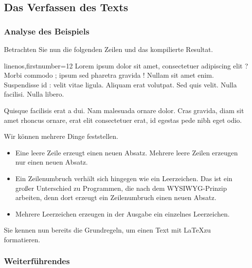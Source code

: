 \subsection{Das Verfassen des Texts}

\subsubsection{Analyse des Beispiels}
Betrachten Sie nun die folgenden Zeilen und das kompilierte Resultat.


\begin{latexcode*}{linenos,firstnumber=12}
Lorem ipsum dolor sit amet, consectetuer adipiscing elit ?
Morbi commodo ; ipsum sed pharetra gravida !
Nullam sit amet enim. Suspendisse id : velit vitae ligula.
Aliquam erat volutpat.
Sed quis velit. Nulla facilisi. Nulla libero. 

Quisque facilisis erat a dui.
Nam malesuada ornare dolor.
Cras gravida, diam sit amet rhoncus ornare, 
erat      elit consectetuer erat, id egestas pede nibh eget odio.
\end{latexcode*}


Wir können mehrere Dinge feststellen.
\begin{itemize}
\item Eine leere Zeile erzeugt einen neuen Absatz. Mehrere leere Zeilen erzeugen nur einen neuen Absatz.
\item Ein Zeilenumbruch verhält sich hingegen wie ein Leerzeichen. Das ist ein großer Unterschied zu Programmen, die nach dem WYSIWYG-Prinzip arbeiten, denn dort erzeugt ein Zeilenumbruch einen neuen Absatz.
\item Mehrere Leerzeichen erzeugen in der Ausgabe ein einzelnes Leerzeichen. 
\end{itemize}

Sie kennen nun bereits die Grundregeln, um einen Text mit \LaTeX zu formatieren.

\subsubsection{Weiterführendes}%

